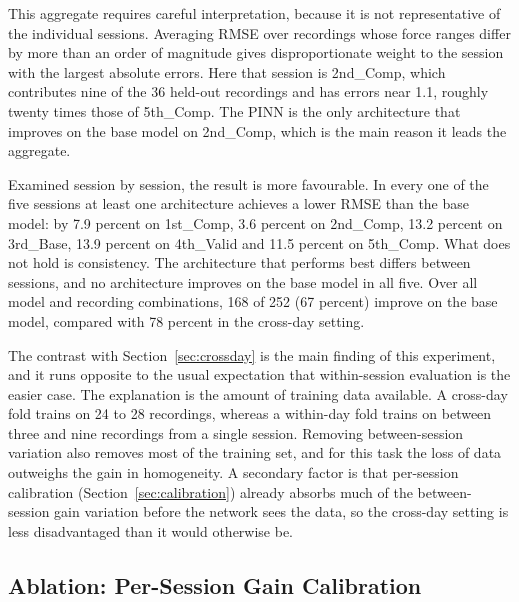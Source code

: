 This aggregate requires careful interpretation, because it is not representative
of the individual sessions. Averaging RMSE over recordings whose force ranges
differ by more than an order of magnitude gives disproportionate weight to the
session with the largest absolute errors. Here that session is 2nd\_Comp, which
contributes nine of the 36 held-out recordings and has errors near 1.1, roughly
twenty times those of 5th\_Comp. The PINN is the only architecture that improves
on the base model on 2nd\_Comp, which is the main reason it leads the aggregate.

Examined session by session, the result is more favourable. In every one of the
five sessions at least one architecture achieves a lower RMSE than the base
model: by 7.9 percent on 1st\_Comp, 3.6 percent on 2nd\_Comp, 13.2 percent on
3rd\_Base, 13.9 percent on 4th\_Valid and 11.5 percent on 5th\_Comp. What does
not hold is consistency. The architecture that performs best differs between
sessions, and no architecture improves on the base model in all five. Over all
model and recording combinations, 168 of 252 (67 percent) improve on the base
model, compared with 78 percent in the cross-day setting.

The contrast with Section~\ref{sec:crossday} is the main finding of this
experiment, and it runs opposite to the usual expectation that within-session
evaluation is the easier case. The explanation is the amount of training data
available. A cross-day fold trains on 24 to 28 recordings, whereas a within-day
fold trains on between three and nine recordings from a single session. Removing
between-session variation also removes most of the training set, and for this
task the loss of data outweighs the gain in homogeneity. A secondary factor is
that per-session calibration (Section~\ref{sec:calibration}) already absorbs much
of the between-session gain variation before the network sees the data, so the
cross-day setting is less disadvantaged than it would otherwise be.

\subsection{Ablation: Per-Session Gain Calibration}
\label{sec:ablation-calib}

%

